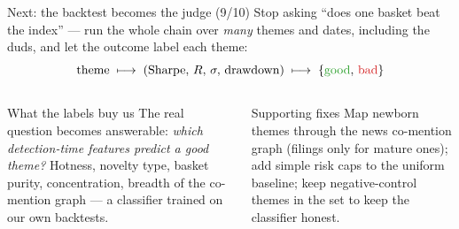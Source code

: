 \documentclass[10pt,aspectratio=169]{beamer}
\newcommand{\gd}[1]{\textcolor{good}{#1}}
\newcommand{\bd}[1]{\textcolor{bad}{#1}}
\begin{document}
\begin{frame}[t]{Next: the backtest becomes the judge (9/10)}
  \footnotesize
  Stop asking ``does one basket beat the index'' --- run the whole chain over \emph{many}
  themes and dates, including the duds, and let the outcome label each theme:
  \[
    \text{theme} \;\longmapsto\; (\text{Sharpe},\, R,\, \sigma,\, \text{drawdown})
    \;\longmapsto\; \{\gd{\text{good}},\, \bd{\text{bad}}\}
  \]

  \vspace{0.1cm}
  \begin{columns}[T,onlytextwidth]
      \begin{block}{What the labels buy us}
        \scriptsize
        The real question becomes answerable: \emph{which detection-time features predict a
        good theme?} Hotness, novelty type, basket purity, concentration, breadth of the
        co-mention graph --- a classifier trained on our own backtests.
      \end{block}
      \begin{block}{Supporting fixes}
        \scriptsize
        Map newborn themes through the news co-mention graph (filings only for mature ones);
        add simple risk caps to the uniform baseline; keep negative-control themes in the
        set to keep the classifier honest.
      \end{block}
  \end{columns}
\end{frame}
\end{document}
